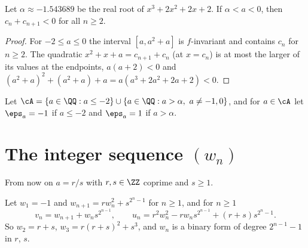 \begin{lemma}
  \label{lem:sumsign}
  \leanok
  Let $\alpha \approx -1.543689$ be the real root of $x^3 + 2x^2 + 2x + 2$. If $\alpha < a < 0$,
  then $c_n + c_{n+1} < 0$ for all $n \ge 2$.
\end{lemma}
\begin{proof}
  \leanok
  For $-2 \le a \le 0$ the interval $[a, a^2 + a]$ is $f$-invariant and contains $c_n$ for
  $n \ge 2$. The quadratic $x^2 + x + a = c_{n+1} + c_n$ (at $x = c_n$) is at most the larger of
  its values at the endpoints, $a(a + 2) < 0$ and $(a^2+a)^2 + (a^2 + a) + a =
  a(a^3 + 2a^2 + 2a + 2) < 0$.
\end{proof}

\begin{definition}
  \label{def:calA}
  \leanok
  Let $\cA = \{a \in \QQ : a \le -2\} \cup \{a \in \QQ : a > \alpha,\ a \ne -1, 0\}$, and for
  $a \in \cA$ let $\eps_a = -1$ if $a \le -2$ and $\eps_a = 1$ if $a > \alpha$.
\end{definition}

\section{The integer sequence \texorpdfstring{$(w_n)$}{(w_n)}}

From now on $a = r/s$ with $r, s \in \ZZ$ coprime and $s \ge 1$.

\begin{definition}[$w_n$, $v_n$, $u_n$]
  \label{def:wseq}
  \leanok
  Let $w_1 = -1$ and $w_{n+1} = r w_n^2 + s^{2^n - 1}$ for $n \ge 1$, and for $n \ge 1$
  \[ v_n = w_{n+1} + w_n s^{2^{n-1}}, \qquad
     u_n = r^2 w_n^2 - r w_n s^{2^{n-1}} + (r + s) s^{2^n - 1}. \]
  So $w_2 = r + s$, $w_3 = r(r+s)^2 + s^3$, and $w_n$ is a binary form of degree $2^{n-1} - 1$ in
  $r$, $s$.
\end{definition}

